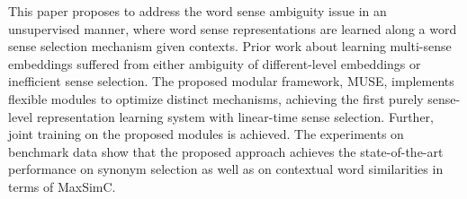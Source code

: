 This paper proposes to address the word sense ambiguity issue in an unsupervised manner, where word sense representations are learned along a word sense selection mechanism given contexts. Prior work about learning multi-sense embeddings suffered from either ambiguity of different-level embeddings or inefficient sense selection. The proposed modular framework, MUSE, implements flexible modules to optimize distinct mechanisms, achieving the first purely sense-level representation learning system with linear-time sense selection. Further, joint training on the proposed modules is achieved. The experiments on benchmark data show that the proposed approach achieves the state-of-the-art performance on synonym selection as well as on contextual word similarities in terms of MaxSimC.
